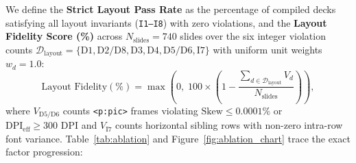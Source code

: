 \documentclass[10pt,journal,compsoc]{IEEEtran}
\begin{document}
We define the \textbf{Strict Layout Pass Rate} as the percentage of compiled decks satisfying all layout invariants (\texttt{I1--I8}) with zero violations, and the \textbf{Layout Fidelity Score (\%)} across $N_{\text{slides}} = 740$ slides over the six integer violation counts $\mathcal{D}_{\text{layout}} = \{\text{D1}, \text{D2/D8}, \text{D3}, \text{D4}, \text{D5/D6}, \text{I7}\}$ with uniform unit weights $w_d = 1.0$:
\begin{equation}
    \text{Layout Fidelity}(\%) = \max\!\left(0,\; 100 \times \left(1 - \frac{\sum_{d \in \mathcal{D}_{\text{layout}}} V_d}{N_{\text{slides}}}\right)\right),
    \label{eq:fidelity}
\end{equation}
where $V_{\text{D5/D6}}$ counts \texttt{<p:pic>} frames violating $\text{Skew} \le 0.0001\%$ or $\text{DPI}_{\text{eff}} \ge 300\text{ DPI}$ and $V_{\text{I7}}$ counts horizontal sibling rows with non-zero intra-row font variance. Table~\ref{tab:ablation} and Figure~\ref{fig:ablation_chart} trace the exact factor progression:
\end{document}

